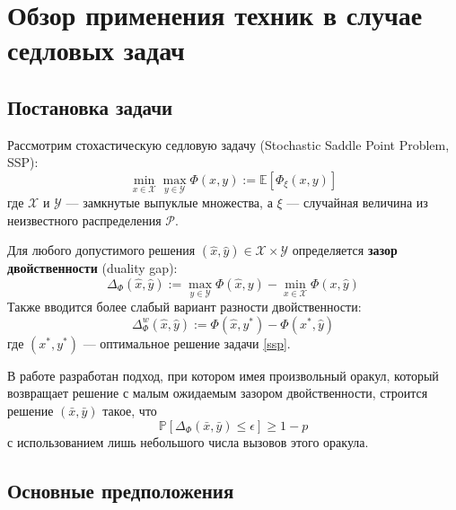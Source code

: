 \section{Обзор применения техник в случае седловых задач}

\subsection{Постановка задачи}

Рассмотрим стохастическую седловую задачу (Stochastic Saddle Point Problem, SSP):
\begin{equation} \label{ssp}
\min_{x \in \mathcal{X}} \max_{y \in \mathcal{Y}} \Phi(x,y) := \mathbb{E}[\Phi_{\xi}(x,y)]
\end{equation}
где $\mathcal{X}$ и $\mathcal{Y}$ — замкнутые выпуклые множества, а $\xi$ — случайная величина из неизвестного распределения $\mathcal{P}$.

Для любого допустимого решения $(\hat{x}, \hat{y}) \in \mathcal{X} \times \mathcal{Y}$ определяется \textbf{зазор двойственности} (duality gap):
\begin{equation}
\Delta_{\Phi}(\hat{x},\hat{y}) := \max_{y\in\mathcal{Y}} \Phi(\hat{x},y) - \min_{x\in\mathcal{X}} \Phi(x,\hat{y})
\end{equation}
Также вводится более слабый вариант разности двойственности:
\begin{equation}
\Delta^w_{\Phi}(\hat{x},\hat{y}) := \Phi(\hat{x},y^*) - \Phi(x^*,\hat{y})
\end{equation}
где $(x^*, y^*)$ — оптимальное решение задачи \eqref{ssp}.

В работе \cite{li2024general} разработан подход, при котором имея произвольный оракул, который возвращает решение с малым ожидаемым зазором двойственности, строится решение $(\bar{x}, \bar{y})$ такое, что
\begin{equation}
\mathbb{P}[\Delta_{\Phi}(\bar{x},\bar{y}) \leq \epsilon] \geq 1-p
\end{equation}
с использованием лишь небольшого числа вызовов этого оракула.

\subsection{Основные предположения}

